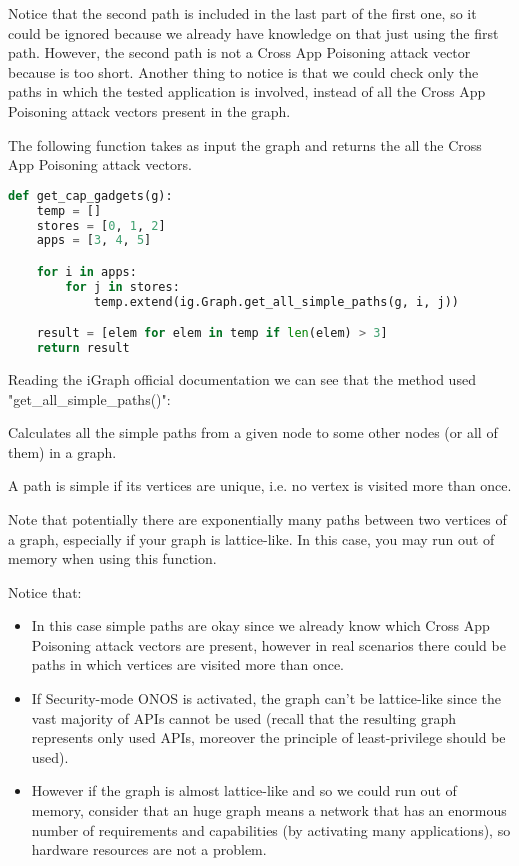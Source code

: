 \documentclass[a4paper,10pt]{memoir}
\begin{document}
Notice that the second path is included in the last part of the first one, so it could be ignored because we already have knowledge on that just using the first path. However, the second path is not a Cross App Poisoning attack vector because is too short. Another thing to notice is that we could check only the paths in which the tested application is involved, instead of all the Cross App Poisoning attack vectors present in the graph.

The following function takes as input the graph and returns the all the Cross App Poisoning attack vectors.
\begin{lstlisting}[language=python,firstnumber=113]
def get_cap_gadgets(g):
    temp = []
    stores = [0, 1, 2]
    apps = [3, 4, 5]

    for i in apps:
        for j in stores:
            temp.extend(ig.Graph.get_all_simple_paths(g, i, j))

    result = [elem for elem in temp if len(elem) > 3]
    return result
\end{lstlisting}

Reading the iGraph official documentation \cite{igraph-api} we can see that the method used\\ "get\_all\_simple\_paths()":
\begin{quoting}[font=itshape, begintext={"}, endtext={"}]
Calculates all the simple paths from a given node to some other nodes (or all of them) in a graph.

A path is simple if its vertices are unique, i.e. no vertex is visited more than once.

Note that potentially there are exponentially many paths between two vertices of a graph, especially if your graph is lattice-like. In this case, you may run out of memory when using this function.
\end{quoting}

Notice that:
\begin{itemize}
    \item In this case simple paths are okay since we already know which Cross App Poisoning attack vectors are present, however in real scenarios there could be paths in which vertices are visited more than once. 
    \item If Security-mode ONOS is activated, the graph can't be lattice-like since the vast majority of APIs cannot be used (recall that the resulting graph represents only used APIs, moreover the principle of least-privilege should be used).
    \item However if the graph is almost lattice-like and so we could run out of memory, consider that an huge graph means a network that has an enormous number of requirements and capabilities (by activating many applications), so hardware resources are not a problem.
\end{itemize}
\end{document}
